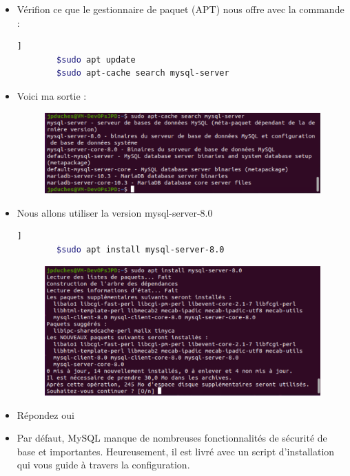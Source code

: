 	\begin{itemize}
		\item  Vérifion ce que le gestionnaire de paquet (APT) nous offre avec la commande :
		\begin{lstlisting}[language=bash]   ]
		$sudo apt update
		$sudo apt-cache search mysql-server
		\end{lstlisting}
		
		\item Voici ma sortie :
		\begin{figure}[!htb]
			\centering
			\includegraphics[scale=0.5]{images/capture5}
		\end{figure}
		
		\item Nous allons utiliser la version mysql-server-8.0
		\begin{lstlisting}[language=bash]   ]
		$sudo apt install mysql-server-8.0
		\end{lstlisting}
		
		\begin{figure}[!htb]
			\centering
			\includegraphics[scale=0.5]{images/capture6}
		\end{figure}
		
		\item Répondez {\color{blue}oui}
		
		\item Par défaut, MySQL manque de nombreuses fonctionnalités de sécurité de base et importantes. Heureusement, il est livré avec un script d'installation qui vous guide à travers la configuration.
		

\end{itemize}
